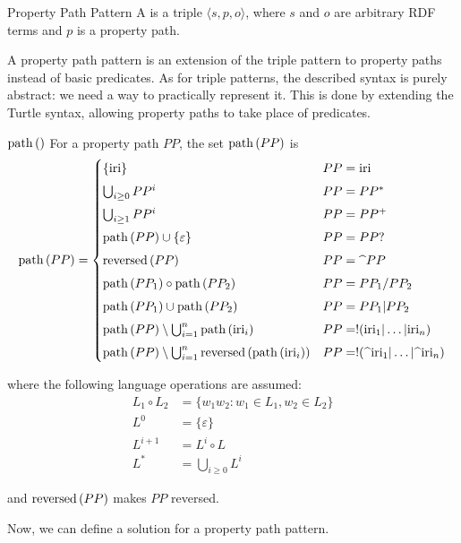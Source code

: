 \begin{definition}{Property Path Pattern}
    A  is a triple \(\langle s, p, o\rangle\), where \(s\) and \(o\) are arbitrary RDF terms and \(p\) is a property path.
\end{definition}

\noindent
A property path pattern is an extension of the triple pattern to property paths instead of basic predicates.
As for triple patterns, the described syntax is purely abstract: we need a way to practically represent it.
This is done by extending the Turtle syntax, allowing property paths to take place of predicates.

\begin{definition}{\(\operatorname{path}\left( \right)\)}
    For a property path \(PP\), the set \(\operatorname{path}\left(PP \right)\) is 
    \[
    \operatorname{path}\left(PP \right) = \begin{cases}
        \{\text{iri}\} & PP=\text{iri}  \\[4pt]
        \bigcup_{i \geq 0}PP^i & PP=PP^* \\[4pt]
        \bigcup_{i \geq 1}PP^i & PP=PP^+ \\[4pt]
        \operatorname{path}\left(PP \right) \cup \{\varepsilon\} & PP=PP? \\[4pt]
        \operatorname{reversed}\left(PP\right) & PP=\text{\textasciicircum}PP \\[4pt]
        \operatorname{path}\left(PP_1 \right) \circ \operatorname{path}\left(PP_2 \right) & PP=PP_1/PP_2 \\[4pt]
        \operatorname{path}\left(PP_1 \right) \cup \operatorname{path}\left(PP_2 \right) & PP=PP_1|PP_2 \\[4pt]
        \operatorname{path}\left(PP \right) \setminus \bigcup_{i=1}^{n}\operatorname{path}\left(\text{iri}_i \right) & PP=!(\text{iri}_1|\ldots |\text{iri}_n) \\[4pt]
        \operatorname{path}\left(PP \right) \setminus \bigcup_{i=1}^{n}\operatorname{reversed}\left(\operatorname{path}\left(\text{iri}_i \right)\right) & PP=!(\text{\textasciicircum iri}_1|\ldots | \text{\textasciicircum iri}_n)
    \end{cases}
    \]

    where the following language operations are assumed:
    \begin{align*}
        L_1 \circ L_2 &= \{w_1w_2 : w_1 \in L_1, w_2 \in L_2\} \\
        L^0 &= \{\varepsilon\} \\
        L^{i+1} &= L^{i} \circ L \\
        L^* &= \bigcup_{i \geq 0}L^i
    \end{align*}

    and \(\operatorname{reversed}\left(PP\right)\) makes \(PP\) reversed.  
\end{definition}
Now, we can define a solution for a property path pattern.

